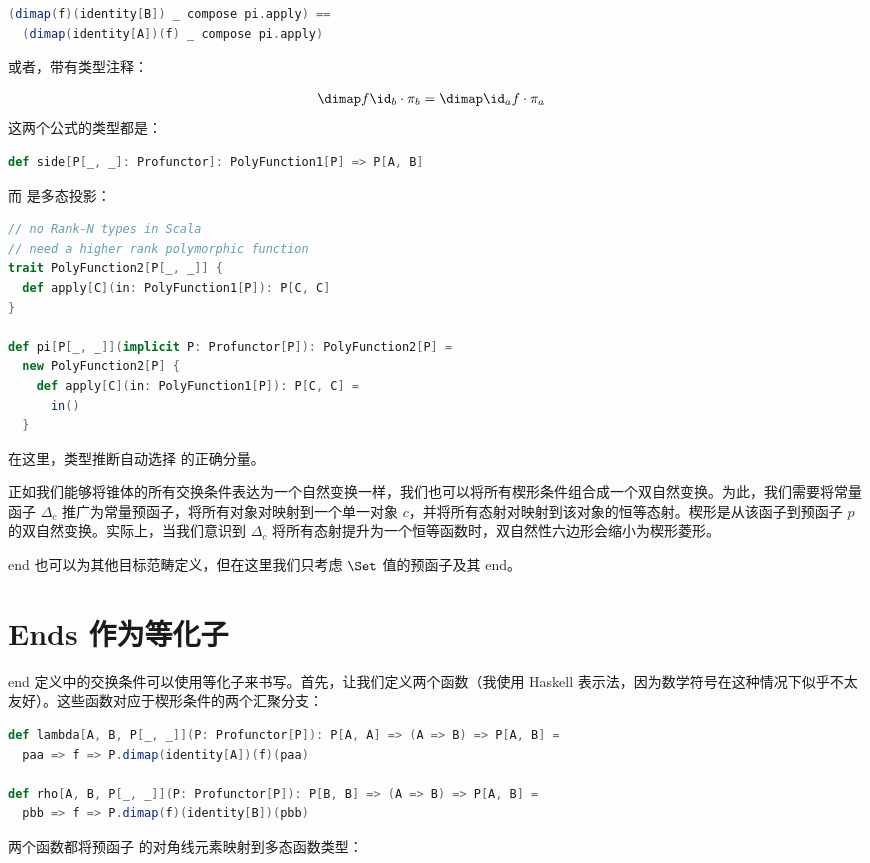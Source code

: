 \begin{lstlisting}[language=Scala]
(dimap(f)(identity[B]) _ compose pi.apply) ==
  (dimap(identity[A])(f) _ compose pi.apply)
\end{lstlisting}
或者，带有类型注释：

\begin{align}
  \dimap f \id_b \cdot \pi_b &= \dimap \id_a f \cdot \pi_a
\end{align}
这两个公式的类型都是：

\begin{lstlisting}[language=Scala]
def side[P[_, _]: Profunctor]: PolyFunction1[P] => P[A, B]
\end{lstlisting}
而  是多态投影：

\begin{lstlisting}[language=Scala]
// no Rank-N types in Scala
// need a higher rank polymorphic function
trait PolyFunction2[P[_, _]] {
  def apply[C](in: PolyFunction1[P]): P[C, C]
}

def pi[P[_, _]](implicit P: Profunctor[P]): PolyFunction2[P] =
  new PolyFunction2[P] {
    def apply[C](in: PolyFunction1[P]): P[C, C] =
      in()
  }
\end{lstlisting}
在这里，类型推断自动选择  的正确分量。

正如我们能够将锥体的所有交换条件表达为一个自然变换一样，我们也可以将所有楔形条件组合成一个双自然变换。为此，我们需要将常量函子 $\Delta_c$ 推广为常量预函子，将所有对象对映射到一个单一对象 $c$，并将所有态射对映射到该对象的恒等态射。楔形是从该函子到预函子 $p$ 的双自然变换。实际上，当我们意识到 $\Delta_c$ 将所有态射提升为一个恒等函数时，双自然性六边形会缩小为楔形菱形。

end 也可以为其他目标范畴定义，但在这里我们只考虑 $\Set$ 值的预函子及其 end。

\section{Ends 作为等化子}

end 定义中的交换条件可以使用等化子来书写。首先，让我们定义两个函数（我使用 Haskell 表示法，因为数学符号在这种情况下似乎不太友好）。这些函数对应于楔形条件的两个汇聚分支：

\begin{lstlisting}[language=Scala]
def lambda[A, B, P[_, _]](P: Profunctor[P]): P[A, A] => (A => B) => P[A, B] =
  paa => f => P.dimap(identity[A])(f)(paa)

def rho[A, B, P[_, _]](P: Profunctor[P]): P[B, B] => (A => B) => P[A, B] =
  pbb => f => P.dimap(f)(identity[B])(pbb)
\end{lstlisting}
两个函数都将预函子  的对角线元素映射到多态函数类型：

